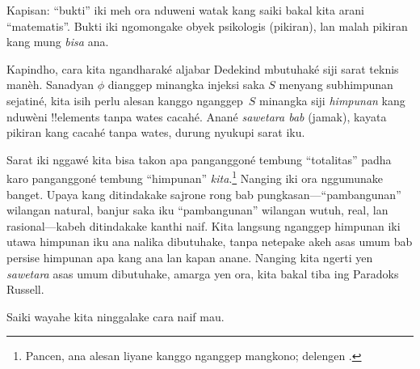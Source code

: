 \documentclass[../../../include/open-logic-section]{subfiles}
\begin{document}
Kapisan: ``bukti'' iki meh ora nduweni watak kang saiki bakal kita
arani ``matematis''. Bukti iki ngomongake obyek psikologis (pikiran),
lan malah pikiran kang mung \emph{bisa} ana.

Kapindho, cara kita ngandharaké aljabar Dedekind mbutuhaké siji sarat
teknis manèh. Sanadyan $\phi$ dianggep minangka injeksi saka $S$ menyang subhimpunan sejatiné,
kita isih perlu alesan kanggo nganggep~$S$ minangka siji \emph{himpunan}
kang nduwèni !!{element}s tanpa wates cacahé. Anané \emph{sawetara bab}
(jamak), kayata pikiran kang cacahé tanpa wates, durung nyukupi sarat iku.

Sarat iki nggawé kita bisa takon apa panganggoné tembung ``totalitas''
padha karo panganggoné tembung ``himpunan'' \emph{kita}.\footnote{Pancen, ana alesan liyane
kanggo nganggep mangkono; delengen \citet[kaca~23]{Potter2004}.} Nanging
iki ora nggumunake banget. Upaya kang ditindakake sajrone rong bab
pungkasan---``pambangunan'' wilangan natural, banjur saka iku
``pambangunan'' wilangan wutuh, real, lan rasional---kabeh ditindakake
kanthi naif. Kita langsung nganggep himpunan iki utawa himpunan iku ana
nalika dibutuhake, tanpa netepake akeh asas umum bab persise himpunan
apa kang ana lan kapan anane. Nanging kita ngerti yen \emph{sawetara}
asas umum dibutuhake, amarga yen ora, kita bakal tiba ing Paradoks
Russell.

Saiki wayahe kita ninggalake cara naif mau.
\end{document}
